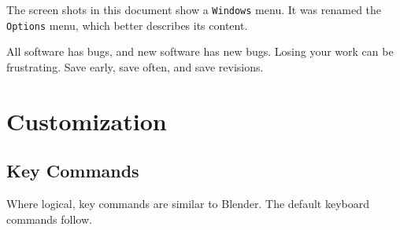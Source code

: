 \documentclass[12pt]{report}
\begin{document}
The screen shots in this document show a {\tt Windows} menu.  It was
renamed the {\tt Options} menu, which better describes its content.

All software has bugs, and new software has new bugs.  Losing your
work can be frustrating.  Save early, save often, and save revisions.

\section{Customization}

\subsection{Key Commands}

Where logical, key commands are similar to Blender.  The default
keyboard commands follow.
\end{document}

